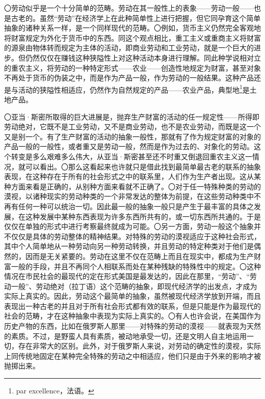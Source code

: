 \documentclass[a5paper,twoside,10.5pt]{ctexart}
\begin{document}
〇劳动似乎是一个十分简单的范畴。劳动在其一般性上的表象——劳动一般——也是古老的。虽然“劳动”在经济学上在此种简单性上进行把握，但它同孕育这个简单抽象的诸种关系一样，是一个同样现代的范畴。〇例如，货币主义仍然完全客观地将财富规定为外化于货币中的东西。同这个观点相比，重工主义或重商主义将财富的源泉由物体转而规定为主体的活动，即商业劳动和工业劳动，就是一个巨大的进步。但仍然仅仅在赚钱这种狭隘性上对这种活动本身进行理解。同此种学说相对立的重农主义，将劳动的一种特定形式——农业——创造性地规定为财富，甚至对象不再处于货币的伪装之中，而是作为产品一般，作为劳动的一般结果。这种产品还是与活动的狭隘性相适应，仍然作为自然规定的产品——农业产品，典型地\footnote{par excellence，法语。}是土地产品。

〇亚当·斯密所取得的巨大进展是，抛弃生产财富的活动的任一规定性——所得即劳动绝对，它既不是工业劳动，又不是商业劳动，也不是农业劳动，而既是这一个又是别一个。有了生产财富的活动的抽象一般性，那就有了作为规定财富的对象的产品一般的一般性，或者重又是劳动一般，然而是作为过去的、对象化的劳动。这个转变是多么艰难多么伟大，从亚当·斯密甚至还不时重又倒退回重农主义这一情况，就可以看出。〇那么这看起来也许就只是借此找到最简单最古老的联系的抽象表现，在这种存在于所有的社会形式之中的联系里，人们作为生产者出现。这从某种方面来看是正确的，从别种方面来看就不正确了。〇对于任一特殊种类的劳动的漠视，以诸种现实的劳动种类的一个非常发达的整体为前提，在这些劳动种类中不再有任何一种可以统治一切。因此最一般的抽象一般只是产生于最丰富的具体之发展，在这种发展中某种东西表现为许多东西所共有的，或一切东西所共通的。于是仅仅在单独的形式中进行考察最终就成为可能。〇另一方面，劳动一般这个抽象并不仅仅是具体的劳动整体的精神结果。对特殊的劳动的漠视适应于这种社会形式，其中个人简单地从一种劳动向另一种劳动转换，并且劳动的特定种类对于他们是偶然的，因而是无关紧要的。劳动在这里不仅在范畴上而且在现实中，都成为生产财富一般的手段，并且不再同个人相联系而处在某种残缺的特殊性中的规定。〇这种情况在市民社会的最现代的定在形式美国是最发达的，因此在那里，“劳动”、“劳动一般”、劳动绝对（拉丁语）这个范畴的抽象，即现代经济学的出发点，才成为实际上真实的。因此，劳动这个最简单的抽象，虽然被现代经济学放到开端，而且表现出一种古老的并且对于所有社会形式都有效的联系，但是只能是作为最现代的社会的范畴，才在这种抽象中表现为实际上真实的。〇有人也许会说，在美国作为历史产物的东西，比如在俄罗斯人那里——对特殊的劳动的漠视——就表现为天然的素质。不过，是野蛮人具有素质，被动地承受一切，还是文明人自主地运用一切，存在非常大的区别。此外，对于俄罗斯人来说，对劳动的确定性的漠视，实际上同传统地固定在某种完全特殊的劳动之中相适应，他们只是由于外来的影响才被抛掷出来。
\end{document}
